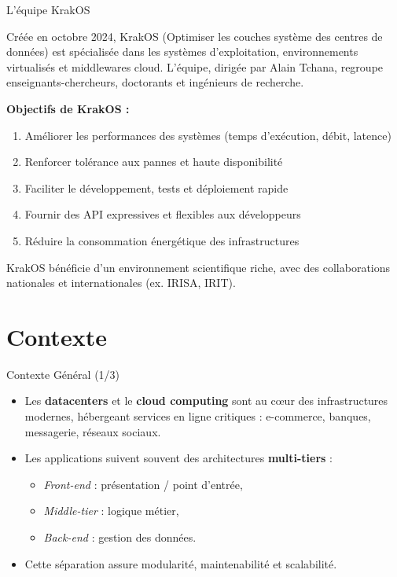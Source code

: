 \documentclass[aspectratio=43,8pt]{beamer}
\begin{document}
\begin{frame}{L’équipe KrakOS}
\begin{card}
Créée en octobre 2024, KrakOS (Optimiser les couches système des centres de données) est spécialisée dans les systèmes d’exploitation, environnements virtualisés et middlewares cloud.  
L’équipe, dirigée par Alain Tchana, regroupe enseignants-chercheurs, doctorants et ingénieurs de recherche.

\medskip
\textbf{Objectifs de KrakOS :}
\begin{enumerate}
    \item Améliorer les performances des systèmes (temps d’exécution, débit, latence)
    \item Renforcer tolérance aux pannes et haute disponibilité
    \item Faciliter le développement, tests et déploiement rapide
    \item Fournir des API expressives et flexibles aux développeurs
    \item Réduire la consommation énergétique des infrastructures
\end{enumerate}

\medskip
KrakOS bénéficie d’un environnement scientifique riche, avec des collaborations nationales et internationales (ex. IRISA, IRIT).
\end{card}
\end{frame}

\section{Contexte}
\begin{frame}{Contexte Général (1/3)}
    \begin{card}
        \begin{itemize}
            \item Les \textbf{datacenters} et le \textbf{cloud computing} sont au cœur des infrastructures modernes, hébergeant services en ligne critiques : e-commerce, banques, messagerie, réseaux sociaux.
            \item Les applications suivent souvent des architectures \textbf{multi-tiers} : 
            \begin{itemize}
                \item \emph{Front-end} : présentation / point d'entrée,
                \item \emph{Middle-tier} : logique métier,
                \item \emph{Back-end} : gestion des données.
            \end{itemize}
            \item Cette séparation assure modularité, maintenabilité et scalabilité.
        \end{itemize}
    \end{card}
\end{frame}
\end{document}
